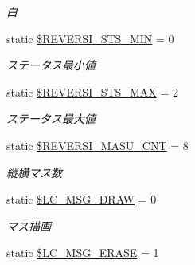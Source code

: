 \begin{DoxyCompactItemize}
\begin{DoxyCompactList}\small\item\em 白 \end{DoxyCompactList}\item 
static \hyperlink{class_reversi_const_aa0e0852db16c70abcbf8b55b9bccfedc}{\$\+R\+E\+V\+E\+R\+S\+I\+\_\+\+S\+T\+S\+\_\+\+M\+IN} = 0\hypertarget{class_reversi_const_aa0e0852db16c70abcbf8b55b9bccfedc}{}\label{class_reversi_const_aa0e0852db16c70abcbf8b55b9bccfedc}

\begin{DoxyCompactList}\small\item\em ステータス最小値 \end{DoxyCompactList}\item 
static \hyperlink{class_reversi_const_abe1166d89a529d2a7f9bd235e14e9b64}{\$\+R\+E\+V\+E\+R\+S\+I\+\_\+\+S\+T\+S\+\_\+\+M\+AX} = 2\hypertarget{class_reversi_const_abe1166d89a529d2a7f9bd235e14e9b64}{}\label{class_reversi_const_abe1166d89a529d2a7f9bd235e14e9b64}

\begin{DoxyCompactList}\small\item\em ステータス最大値 \end{DoxyCompactList}\item 
static \hyperlink{class_reversi_const_a1346cd55e42c8ed965831ea2eba3e26f}{\$\+R\+E\+V\+E\+R\+S\+I\+\_\+\+M\+A\+S\+U\+\_\+\+C\+NT} = 8\hypertarget{class_reversi_const_a1346cd55e42c8ed965831ea2eba3e26f}{}\label{class_reversi_const_a1346cd55e42c8ed965831ea2eba3e26f}

\begin{DoxyCompactList}\small\item\em 縦横マス数 \end{DoxyCompactList}\item 
static \hyperlink{class_reversi_const_af2cfd84202bbe2dfb22250be713aea65}{\$\+L\+C\+\_\+\+M\+S\+G\+\_\+\+D\+R\+AW} = 0\hypertarget{class_reversi_const_af2cfd84202bbe2dfb22250be713aea65}{}\label{class_reversi_const_af2cfd84202bbe2dfb22250be713aea65}

\begin{DoxyCompactList}\small\item\em マス描画 \end{DoxyCompactList}\item 
static \hyperlink{class_reversi_const_af1e58340af7831eaf0458fe771f51119}{\$\+L\+C\+\_\+\+M\+S\+G\+\_\+\+E\+R\+A\+SE} = 1\hypertarget{class_reversi_const_af1e58340af7831eaf0458fe771f51119}{}\label{class_reversi_const_af1e58340af7831eaf0458fe771f51119}


\end{DoxyCompactItemize}
